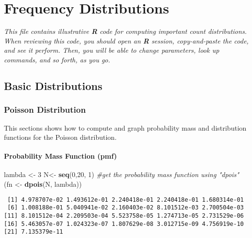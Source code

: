 \documentclass[]{book}
\newenvironment{Shaded}{\begin{snugshade}}{\end{snugshade}}
\newcommand{\KeywordTok}[1]{\textcolor[rgb]{0.13,0.29,0.53}{\textbf{#1}}}
\newcommand{\DecValTok}[1]{\textcolor[rgb]{0.00,0.00,0.81}{#1}}
\newcommand{\StringTok}[1]{\textcolor[rgb]{0.31,0.60,0.02}{#1}}
\newcommand{\CommentTok}[1]{\textcolor[rgb]{0.56,0.35,0.01}{\textit{#1}}}
\newcommand{\NormalTok}[1]{#1}
\theoremstyle{definition}
\theoremstyle{definition}
\theoremstyle{definition}
\theoremstyle{remark}
\begin{document}
\chapter{Frequency Distributions}\label{frequency-distributions}

\emph{This file contains illustrative \textbf{R} code for computing
important count distributions. When reviewing this code, you should open
an \textbf{R} session, copy-and-paste the code, and see it perform.
Then, you will be able to change parameters, look up commands, and so
forth, as you go.}

\section{Basic Distributions}\label{basic-distributions}

\subsection{Poisson Distribution}\label{poisson-distribution}

This sections shows how to compute and graph probability mass and
distribution functions for the Poisson distribution.

\subsubsection{Probability Mass Function
(pmf)}\label{probability-mass-function-pmf}

\begin{Shaded}
\begin{Highlighting}[]
\NormalTok{lambda <-}\StringTok{ }\DecValTok{3}
\NormalTok{N<-}\StringTok{ }\KeywordTok{seq}\NormalTok{(}\DecValTok{0}\NormalTok{,}\DecValTok{20}\NormalTok{, }\DecValTok{1}\NormalTok{)}
\CommentTok{#get the probability mass function using "dpois"}
\NormalTok{(fn <-}\StringTok{ }\KeywordTok{dpois}\NormalTok{(N, lambda))}
\end{Highlighting}
\end{Shaded}

\begin{verbatim}
 [1] 4.978707e-02 1.493612e-01 2.240418e-01 2.240418e-01 1.680314e-01
 [6] 1.008188e-01 5.040941e-02 2.160403e-02 8.101512e-03 2.700504e-03
[11] 8.101512e-04 2.209503e-04 5.523758e-05 1.274713e-05 2.731529e-06
[16] 5.463057e-07 1.024323e-07 1.807629e-08 3.012715e-09 4.756919e-10
[21] 7.135379e-11
\end{verbatim}
\end{document}
